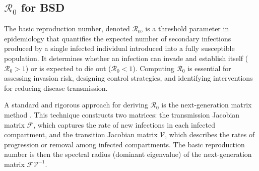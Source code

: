 \documentclass[11pt]{article}
\numberwithin{equation}{section}
\begin{document}
\subsection{\texorpdfstring{$\mathcal{R}_0$}{} for BSD}
The basic reproduction number, denoted $\mathcal{R}_0$, is a threshold parameter in epidemiology that quantifies the expected number of secondary infections produced by a single infected individual introduced into a fully susceptible population. It determines whether an infection can invade and establish itself ($\mathcal{R}_0 > 1$) or is expected to die out ($\mathcal{R}_0 < 1$). Computing $\mathcal{R}_0$ is essential for assessing invasion risk, designing control strategies, and identifying interventions for reducing disease transmission.

A standard and rigorous approach for deriving $\mathcal{R}_0$ is the next-generation matrix method \cite{afful, diekmann, van}. This technique constructs two matrices: the transmission Jacobian matrix $\mathcal{F}$, which captures the rate of new infections in each infected compartment, and the transition Jacobian matrix $\mathcal{V}$, which describes the rates of progression or removal among infected compartments. The basic reproduction number is then the spectral radius (dominant eigenvalue) of the next-generation matrix $\mathcal{FV}^{-1}$.
\end{document}
